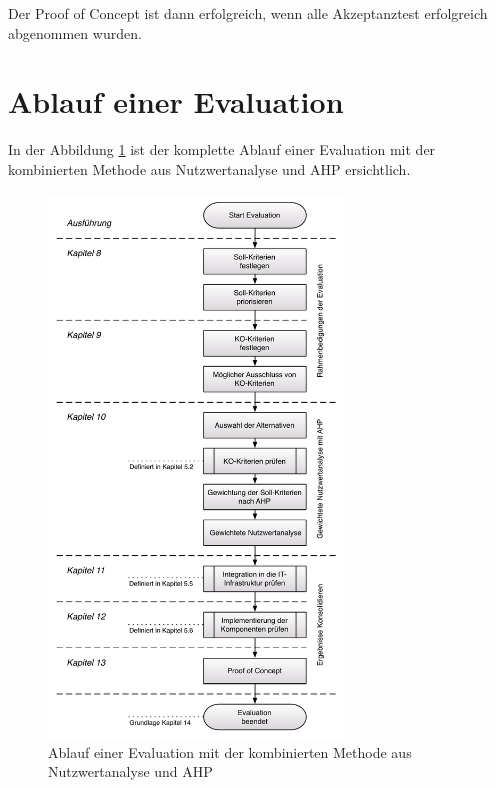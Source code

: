   Der Proof of Concept ist dann erfolgreich, wenn alle Akzeptanztest erfolgreich
  abgenommen wurden.
    
  \section{Ablauf einer Evaluation}
  
  In der Abbildung \ref{img:ablaufEvaluation} ist der komplette Ablauf einer
  Evaluation mit der kombinierten Methode aus Nutzwertanalyse und
  \ac{AHP} ersichtlich.
  
  \begin{figure}[h!]
    \begin{center}
      \includegraphics[width=0.7\textwidth]{./image/kompletterAblaufDerEvaluation.pdf}
      \caption{Ablauf einer Evaluation mit der kombinierten Methode aus
      Nutzwertanalyse und \ac{AHP}}
      \label{img:ablaufEvaluation}
    \end{center}
  \end{figure}
